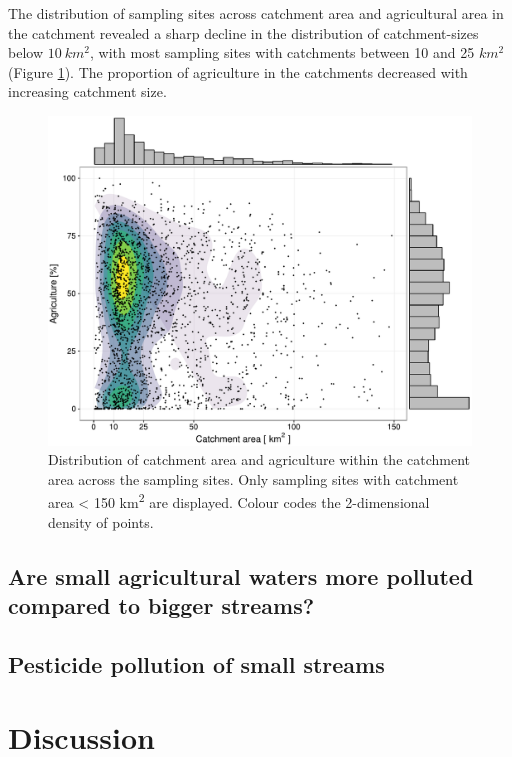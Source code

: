 \documentclass[journal=esthag,manuscript=article]{achemso}
\begin{document}
The distribution of sampling sites across catchment area and agricultural area in the catchment revealed a sharp decline in the distribution of catchment-sizes below $10~km^2$, with most sampling sites with catchments between 10 and 25 $km^2$ (Figure \ref{fig:figezglu}).
The proportion of agriculture in the catchments decreased with increasing catchment size.


\begin{figure}
  \includegraphics[width=.8\textwidth]{fig/ezglu.pdf}
  \caption{Distribution of catchment area and agriculture within the catchment area across the sampling sites.
  Only sampling sites with catchment area < 150 km\textsuperscript{2} are displayed. 
  Colour codes the 2-dimensional density of points.
  }
  \label{fig:figezglu}
\end{figure}


\subsection{Are small agricultural waters more polluted compared to bigger streams?}




\subsection{Pesticide pollution of small streams}




\section{Discussion}


\end{document}
